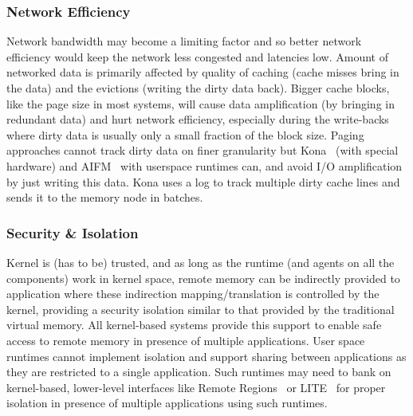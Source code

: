 \subsubsection{Network Efficiency}
Network bandwidth may become a limiting factor and so better 
network efficiency would keep the network less congested and 
latencies low. Amount of networked data is primarily affected 
by quality of caching (cache misses bring in the data) and 
the evictions (writing the dirty data back). Bigger cache
blocks, like the page size in most systems, will cause 
data amplification (by bringing in redundant data) and hurt 
network efficiency, especially during the write-backs where 
dirty data is usually only a small fraction of the block size. 
Paging approaches cannot track dirty data on finer granularity 
but Kona~\cite{kona} (with special hardware) and AIFM~\cite{aifm}
with userspace runtimes can, and avoid I/O amplification by just 
writing this data. Kona uses a log to track multiple dirty 
cache lines and sends it to the memory node in batches.

\subsubsection{Security \& Isolation}
Kernel is (has to be) trusted, and as long as the 
runtime (and agents on all the components) work in 
kernel space, remote memory can be indirectly provided 
to application where these indirection mapping/translation 
is controlled by the kernel, providing a security 
isolation similar to that provided by the traditional 
virtual memory. All kernel-based systems provide this 
support to enable safe access to remote memory in presence
of multiple applications. User space runtimes cannot 
implement isolation and support sharing between 
applications as they are restricted to a single application. 
Such runtimes may need to 
bank on kernel-based, lower-level interfaces like 
Remote Regions~\cite{remregions} or LITE~\cite{literdma}
for proper isolation in presence of multiple applications 
using such runtimes. 


